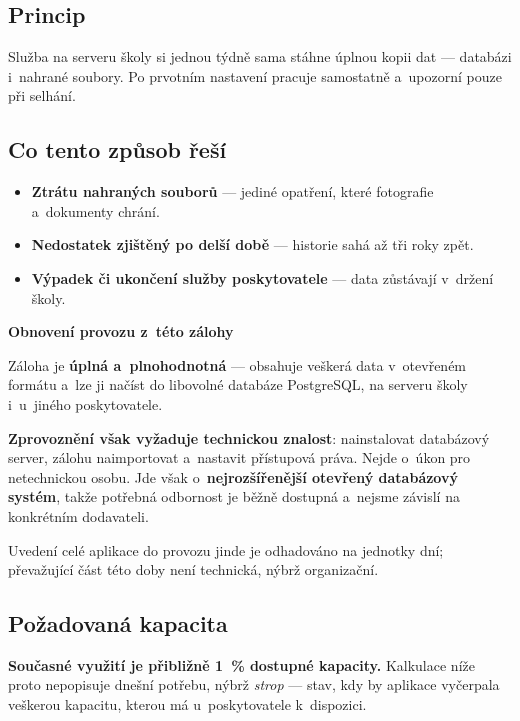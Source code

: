 \documentclass[11pt,a4paper]{article}
\newcommand{\headfont}{\fontfamily{Montserrat-TLF}\selectfont}
\newcommand{\boxhead}[2]{{\headfont\bfseries\color{#1}#2}\par\smallskip}
\begin{document}
\subsection{Princip}

Služba na serveru školy si jednou týdně sama stáhne úplnou kopii dat --- databázi i~nahrané
soubory. Po prvotním nastavení pracuje samostatně a~upozorní pouze při selhání.

\subsection{Co tento způsob řeší}

\begin{itemize}
  \item \textbf{Ztrátu nahraných souborů} --- jediné opatření, které fotografie a~dokumenty
        chrání.
  \item \textbf{Nedostatek zjištěný po delší době} --- historie sahá až tři roky zpět.
  \item \textbf{Výpadek či ukončení služby poskytovatele} --- data zůstávají v~držení školy.
\end{itemize}

\begin{klid}
\boxhead{tapok}{Obnovení provozu z~této zálohy}
Záloha je \textbf{úplná a~plnohodnotná} --- obsahuje veškerá data v~otevřeném formátu a~lze ji
načíst do libovolné databáze PostgreSQL, na serveru školy i~u~jiného poskytovatele.

\textbf{Zprovoznění však vyžaduje technickou znalost}: nainstalovat databázový server, zálohu
naimportovat a~nastavit přístupová práva. Nejde o~úkon pro netechnickou osobu. Jde však
o~\textbf{nejrozšířenější otevřený databázový systém}, takže potřebná odbornost je běžně
dostupná a~nejsme závislí na konkrétním dodavateli.

Uvedení celé aplikace do provozu jinde je odhadováno na jednotky dní; převažující část této
doby není technická, nýbrž organizační.
\end{klid}

\subsection{Požadovaná kapacita}

\textbf{Současné využití je přibližně 1~\% dostupné kapacity.} Kalkulace níže proto nepopisuje
dnešní potřebu, nýbrž \emph{strop} --- stav, kdy by aplikace vyčerpala veškerou kapacitu,
kterou má u~poskytovatele k~dispozici.
\end{document}
